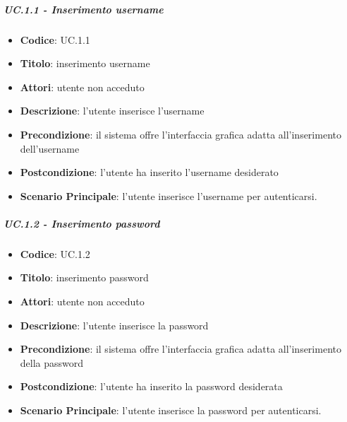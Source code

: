 		\subparagraph{UC\theuccount.1.1 - Inserimento username}
			\begin{itemize}
				\item \textbf{Codice}: UC\theuccount.1.1
				\item \textbf{Titolo}: inserimento username
				\item \textbf{Attori}: utente non acceduto
				\item \textbf{Descrizione}: l'utente inserisce l'username
				\item \textbf{Precondizione}: il sistema offre l'interfaccia grafica adatta all'inserimento dell'username
				\item \textbf{Postcondizione}: l'utente ha inserito l'username desiderato
				\item \textbf{Scenario Principale}: l'utente inserisce l'username per autenticarsi.
			\end{itemize}
		
		\subparagraph{UC\theuccount.1.2 - Inserimento password}
			\begin{itemize}
				\item \textbf{Codice}: UC\theuccount.1.2	
				\item \textbf{Titolo}: inserimento password
				\item \textbf{Attori}: utente non acceduto
				\item \textbf{Descrizione}: l'utente inserisce la password
				\item \textbf{Precondizione}: il sistema offre l'interfaccia grafica adatta all'inserimento della password
				\item \textbf{Postcondizione}: l'utente ha inserito la password desiderata
				\item \textbf{Scenario Principale}: l'utente inserisce la password per autenticarsi.
			\end{itemize}
		
		
	
